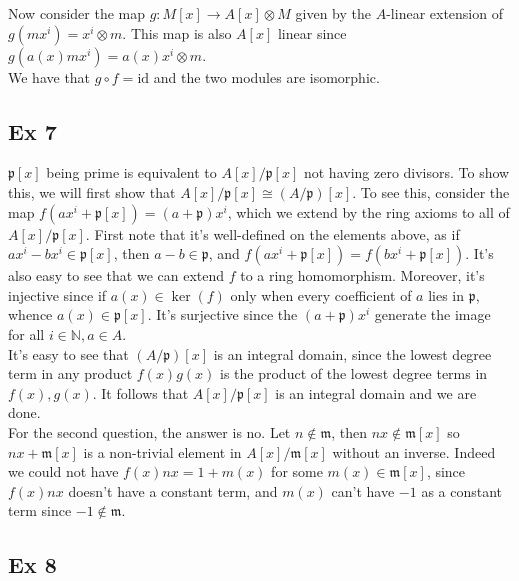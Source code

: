 \documentclass{article}
\theoremstyle{definition}
\newcommand{\N}{\mathbb{N}}
\newcommand{\id}{\text{id}}
\begin{document}
Now consider the map $g : M[x] \to A[x] \otimes M$ given by the $A$-linear
extension of $g(mx^i) = x^i \otimes m$. This map is also $A[x]$ linear since 
$g(a(x)mx^i) = a(x)x^i \otimes m$. \\

We have that $g \circ f = \id$ and the two modules are isomorphic.

\subsection*{Ex 7}
$\mathfrak{p}[x]$ being prime is equivalent to $A[x]/\mathfrak{p}[x]$ not
having zero divisors. To show this, we will first show that
$A[x]/\mathfrak{p}[x] \cong (A / \mathfrak{p})[x]$. To see this, consider the
map $f(ax^i + \mathfrak{p}[x]) = (a + \mathfrak{p})x^i$, which we extend
by the ring axioms to all of $A[x]/\mathfrak{p}[x]$. First note that
it's well-defined on the elements above, as if $ax^i - bx^i \in
\mathfrak{p}[x]$, then $a - b \in \mathfrak{p}$, and $f(ax^i + \mathfrak{p}[x])
= f(bx^i + \mathfrak{p}[x])$. It's also easy to see that we can extend $f$
to a ring homomorphism. Moreover, it's injective since if $a(x) \in \ker(f)$
only when every coefficient of $a$ lies in $\mathfrak{p}$, whence $a(x) \in
\mathfrak{p}[x]$. It's surjective since the $(a + \mathfrak{p})x^i$ generate
the image for all $i \in \N, a \in A$. \\

It's easy to see that $(A/\mathfrak{p})[x]$ is an integral domain, since the
lowest degree term in any product $f(x)g(x)$ is the product of the lowest
degree terms in $f(x), g(x)$. It follows that $A[x]/\mathfrak{p}[x]$ is 
an integral domain and we are done. \\

For the second question, the answer is no. Let $n \not \in \mathfrak{m}$, then
$nx \not \in \mathfrak{m}[x]$ so $nx + \mathfrak{m}[x]$ is a non-trivial
element in $A[x]/\mathfrak{m}[x]$ without an inverse. Indeed we could not have
$f(x)nx = 1 + m(x)$ for some $m(x) \in \mathfrak{m}[x]$, since $f(x)nx$ doesn't
have a constant term, and $m(x)$ can't have $-1$ as a constant term since $-1
\not \in \mathfrak{m}$.

\subsection*{Ex 8}
\end{document}
